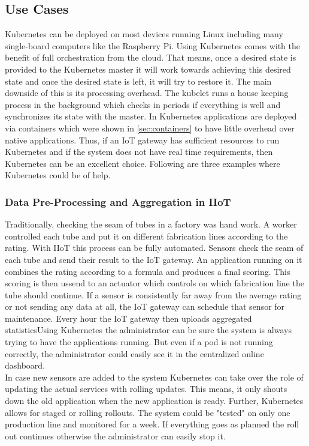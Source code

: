 \subsection{Use Cases}
Kubernetes can be deployed on most devices running Linux including many single-board computers like the Raspberry Pi. Using Kubernetes comes with the benefit of full orchestration from the cloud. That means, once a desired state is provided to the Kubernetes master it will work towards achieving this desired state and once the desired state is left, it will try to restore it. The main downside of this is its processing overhead. The kubelet runs a house keeping process in the background which checks in periods if everything is well and synchronizes its state with the master. In Kubernetes applications are deployed via containers which were shown in \cref{sec:containers} to have little overhead over native applications.
Thus, if an IoT gateway has sufficient resources to run Kubernetes and if the system does not have real time requirements, then Kubernetes can be an excellent choice. Following are three examples where Kubernetes could be of help. 

\subsubsection{Data Pre-Processing and Aggregation in IIoT}
Traditionally, checking the seam of tubes in a factory was hand work. A worker controlled each tube and put it on different fabrication lines according to the rating. With IIoT this process can be fully automated. Sensors check the seam of each tube and send their result to the IoT gateway. An application running on it combines the rating according to a formula and produces a final scoring. This scoring is then ussend to an actuator which controls on which fabrication line the tube should continue. If a sensor is consistently far away from the average rating or not sending any data at all, the IoT gateway can schedule that sensor for maintenance. Every hour the IoT gateway then uploads aggregated statisticsUsing Kubernetes the administrator can be sure the system is always trying to have the applications running. But even if a pod is not running correctly, the administrator could easily see it in the centralized online dashboard. \\
In case new sensors are added to the system Kubernetes can take over the role of updating the actual services with rolling updates. This means, it only shouts down the old application when the new application is ready. Further, Kubernetes allows for staged or rolling rollouts. The system could be "tested" on only one production line and monitored for a week. If everything goes as planned the roll out continues otherwise the administrator can easily stop it. 

